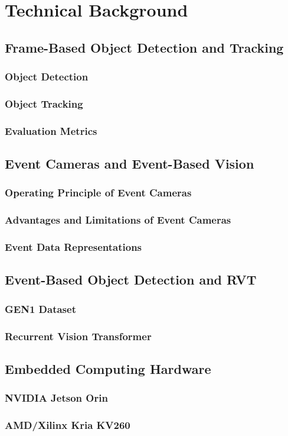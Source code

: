 \chapter{Technical Background}

\section{Frame-Based Object Detection and Tracking}
\subsection{Object Detection}
\subsection{Object Tracking}
\subsection{Evaluation Metrics}

\section{Event Cameras and Event-Based Vision}
\subsection{Operating Principle of Event Cameras}
\subsection{Advantages and Limitations of Event Cameras}
\subsection{Event Data Representations}

\section{Event-Based Object Detection and RVT}
\subsection{GEN1 Dataset}
\subsection{Recurrent Vision Transformer}

\section{Embedded Computing Hardware}
\subsection{NVIDIA Jetson Orin}
\subsection{AMD/Xilinx Kria KV260}
